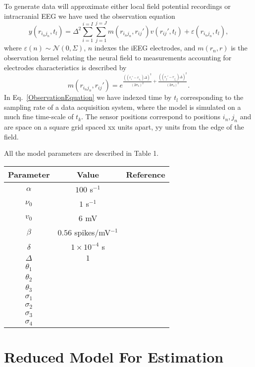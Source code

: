 \documentclass[onecolumn,draftcls]{IEEEtran}
\begin{document}
To generate data will approximate either local field potential recordings or intracranial EEG we have used the observation equation
\begin{equation}\label{ObservationEquation}
    y(r_{i_n j_n},t_l) = \Delta^2\sum_{i=1}^{i=I}\sum_{j=1}^{j=J}  m( r_{i_n j_n},r_{ij}' ) v( r_{ij}',t_l )  + \varepsilon ( r_{i_n j_n},t_l ),
\end{equation}
where $\varepsilon( n )\sim\mathcal{N}(0,\Sigma)$, $n$ indexes the iEEG electrodes, and $m(r_n,r)$ is the observation kernel relating the neural field to measurements accounting for electrodes characteristics is described by
\begin{equation}
	m( r_{i_n j_n},r_{ij}' ) = e^{\frac{\left(\left(r_i'-r_{i_n}\right)\Delta\right)^2}{\left(2\sigma_4\right)^2} + \frac{\left(\left(r_j'-r_{j_n}\right)\Delta\right)^2}{\left(2\sigma_4\right)^2}}.
\end{equation}
In Eq.~\ref{ObservationEquation} we have indexed time by $t_l$ corresponding to the sampling rate of a data acquisition system, where the model is simulated on a much fine time-scale of $t_k$. The sensor positions correspond to positions $i_n,j_n$ and are space on a square grid spaced xx units apart, yy units from the edge of the field.

All the model parameters are described in Table 1.


\begin{tabular}{ccc}
\hline
Parameter & Value & Reference\\
\hline
$\alpha$ & $100$ s$^{-1}$ &\\
\hline
$\nu_0$ & $1$ s$^{-1}$ &\\
\hline
$v_0$ & $6$ mV &\\
\hline
$\beta$ & $0.56$ spikes/mV$^{-1}$ & \\
\hline
$\delta$ & $1\times10^{-4}$ s &\\
\hline
$\Delta$ & $1$ &\\
\hline
$\theta_1$ &  &\\
\hline
$\theta_2$ &  &\\
\hline
$\theta_3$ &  &\\
\hline
$\sigma_1$ &  &\\
\hline
$\sigma_2$ &  &\\
\hline
$\sigma_3$ &  &\\
\hline
$\sigma_4$ &  &\\
\hline
\end{tabular}


\section{Reduced Model For Estimation}
\end{document}
